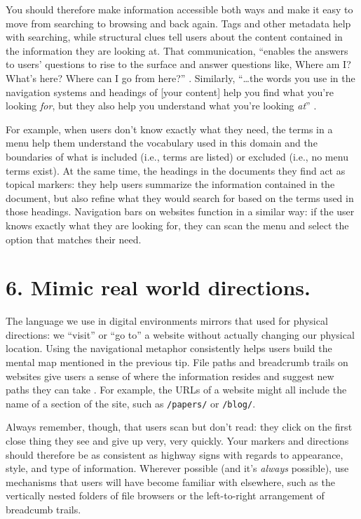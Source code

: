 \documentclass[10pt,letterpaper]{article}
\newcommand{\rulemajor}[1]{\section*{#1}}
\begin{document}
You should therefore make information accessible both ways and make it easy to
move from searching to browsing and back again. Tags and other metadata help
with searching, while structural clues tell users about the content contained in
the information they are looking at. That communication, ``enables the answers
to users' questions to rise to the surface and answer questions like, Where am
I? What's here? Where can I go from here?''  \cite{Rosenfeld2015}. Similarly,
``{\ldots}the words you use in the navigation systems and headings of [your
  content] help you find what you're looking \emph{for}, but they also help you
understand what you're looking \emph{at}'' \cite{Arango2018}.

For example, when users don't know exactly what they need, the terms in a menu
help them understand the vocabulary used in this domain and the boundaries of
what is included (i.e., terms are listed) or excluded (i.e., no menu terms
exist). At the same time, the headings in the documents they find act as topical
markers: they help users summarize the information contained in the document,
but also refine what they would search for based on the terms used in those
headings. Navigation bars on websites function in a similar way: if the user
knows exactly what they are looking for, they can scan the menu and select the
option that matches their need.

\rulemajor{6. Mimic real world directions.}

The language we use in digital environments mirrors that used for physical
directions: we ``visit'' or ``go to'' a website without actually changing our
physical location. Using the navigational metaphor consistently helps users
build the mental map mentioned in the previous tip. File paths and breadcrumb
trails on websites give users a sense of where the information resides and
suggest new paths they can take \cite{Krug2014}. For example, the URLs of a
website might all include the name of a section of the site, such as
\texttt{/papers/} or \texttt{/blog/}.

Always remember, though, that users scan but don't read: they click on the first
close thing they see and give up very, very quickly. Your markers and directions
should therefore be as consistent as highway signs with regards to appearance,
style, and type of information. Wherever possible (and it's \emph{always}
possible), use mechanisms that users will have become familiar with elsewhere,
such as the vertically nested folders of file browsers or the left-to-right
arrangement of breadcumb trails.
\end{document}
